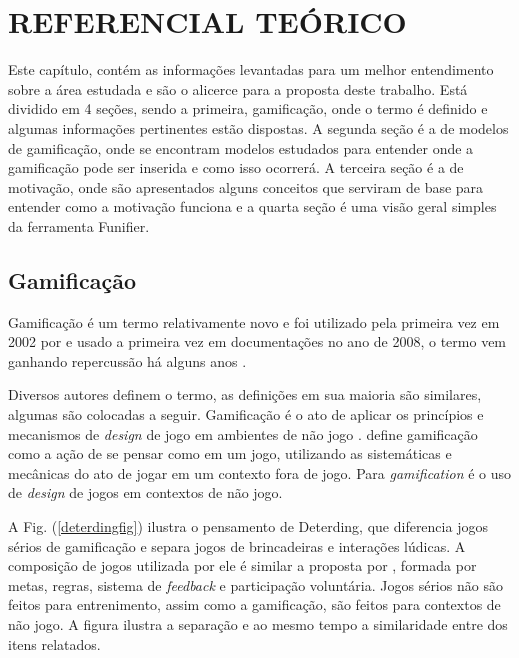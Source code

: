 \chapter[Referencial Teórico]{REFERENCIAL TEÓRICO}

Este capítulo, contém as informações levantadas para um melhor entendimento sobre a área estudada e são o alicerce para a proposta deste trabalho. Está dividido em 4 seções, sendo a primeira, gamificação, onde o termo é definido e algumas informações pertinentes estão dispostas. A segunda seção é a de modelos de gamificação, onde se encontram modelos estudados para entender onde a gamificação pode ser inserida e como isso ocorrerá. A terceira seção é a de motivação, onde são apresentados alguns conceitos que serviram de base para entender como a motivação funciona e a quarta seção é uma visão geral simples da ferramenta Funifier. 

\section{Gamificação}

Gamificação é um termo relativamente novo e foi utilizado pela primeira vez em 2002 por \cite{pelling} e usado a primeira vez em documentações no ano de 2008, o termo vem ganhando repercussão há alguns anos \cite{deterding2011gamification}.

Diversos autores definem o termo, as definições em sua maioria são similares, algumas são colocadas a seguir. Gamificação é o ato de aplicar os princípios e mecanismos de \textit{design}   de jogo em ambientes de não jogo \cite{kumar2013gamification}.
\cite{da2014gamificaccao} define gamificação como a ação de se pensar como em um jogo, utilizando as sistemáticas e mecânicas do ato de jogar em um contexto fora de jogo. Para \cite{deterding2011gamification} \textit{gamification} é o uso de \textit{design}  de jogos em contextos de não jogo. 

A Fig. (\ref{deterdingfig}) ilustra o pensamento de Deterding, que diferencia jogos sérios de gamificação e separa jogos de brincadeiras e interações lúdicas. A composição de jogos utilizada por ele é similar a proposta por \cite{mcgonigal2011reality}, formada por metas, regras, sistema de \textit{feedback} e participação voluntária. Jogos sérios não são feitos para entrenimento, assim como a gamificação, são feitos para contextos de não jogo. A figura ilustra a separação e ao mesmo tempo a similaridade entre dos itens relatados. 


